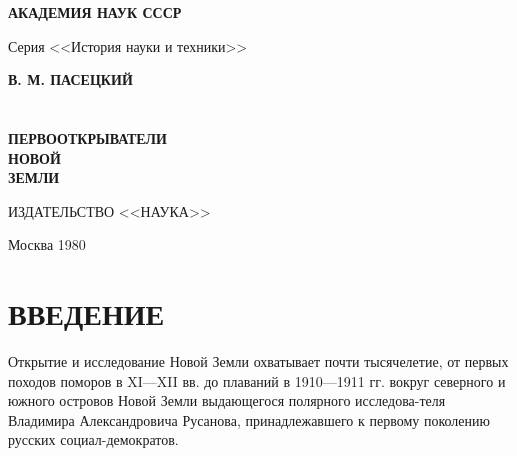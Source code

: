 \documentclass[12pt, a4paper, openany]{book}
\begin{document}
	
	\begin{titlepage}
		
		\begin{center}
			
			
\begin{flushright}
					{\large\bf АКАДЕМИЯ НАУК СССР\\}
				
				Серия <<История науки и техники>>
\end{flushright}
			
			\vspace*{\fill}
\begin{flushright}
				{\large\bf В. М. ПАСЕЦКИЙ\\}
			\ \\
			\ \\
			{\Huge\bf ПЕРВООТКРЫВАТЕЛИ\\ НОВОЙ\\ ЗЕМЛИ\\}
\end{flushright}

			\vspace*{\fill}
			
			\vfill
			
				\begin{flushright}
			
			ИЗДАТЕЛЬСТВО <<НАУКА>>
		
			Москва 1980
			
		\end{flushright}
		\end{center}
		
	\end{titlepage}
	
	\thispagestyle{empty} %
	
	\newpage
	

\setcounter{secnumdepth}{0}
	
	\section[Введение]{\center ВВЕДЕНИЕ}
	
Открытие и исследование Новой Земли охватывает почти тысячелетие, от первых походов поморов в XI—XII вв. до плаваний в 1910—1911 гг. вокруг северного и южного островов Новой Земли выдающегося полярного исследова-теля Владимира Александровича Русанова, принадлежавшего к первому поколению русских социал-демократов. 
\end{document}
